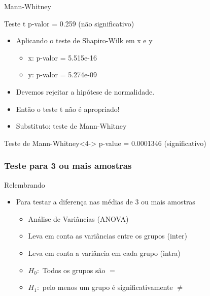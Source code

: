 \documentclass{beamer}
\begin{document}
\begin{frame}{Mann-Whitney}
  \begin{exampleblock}{Teste t}
    \small
    p-valor = 0.259 (não significativo)
  \end{exampleblock}
  \begin{itemize}
    \small
  \item<2-> Aplicando o teste de Shapiro-Wilk em x e y
    \begin{itemize}
      \scriptsize
    \item<2-> x: p-valor = 5.515e-16
    \item<2-> y: p-valor = 5.274e-09
    \end{itemize}
    \bigskip
  \item<3-> Devemos rejeitar a hipótese de normalidade.
  \item<3-> Então o teste t \alert{não é} apropriado!
  \item<3-> Substituto: teste de Mann-Whitney
  \end{itemize}
  \begin{exampleblock}{Teste de Mann-Whitney}<4->
    \small
    p-value = \alert{0.0001346} (significativo)
  \end{exampleblock}
\end{frame}

\subsubsection[3+ amostras]{Teste para 3 ou mais amostras}

\begin{frame}{Relembrando}
  \begin{itemize}
  \item Para testar a diferença nas médias de 3 ou mais amostras
    \begin{itemize}
    \item Análise de Variâncias (ANOVA)
      \bigskip
    \item Leva em conta as variâncias entre os grupos (\alert{inter})
    \item Leva em conta a variância em cada grupo (\alert{intra})
      \bigskip
    \item $H_0:$ Todos os grupos são $=$
      \bigskip
    \item $H_1:$ pelo menos um grupo é significativamente $\ne$
    \end{itemize}
  \end{itemize}
\end{frame}
\end{document}
